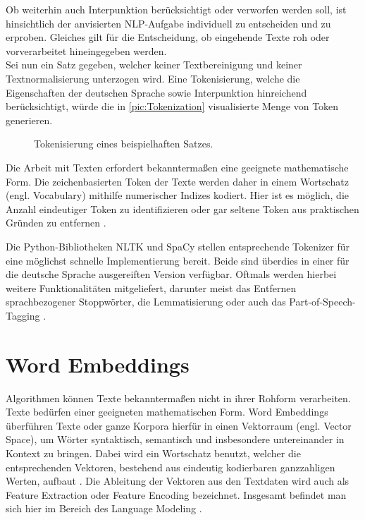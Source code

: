 \noindent
Ob weiterhin auch Interpunktion berücksichtigt oder verworfen werden soll, ist hinsichtlich der anvisierten \ac{NLP}-Aufgabe individuell zu entscheiden und zu erproben. Gleiches gilt für die Entscheidung, ob eingehende Texte roh oder vorverarbeitet hineingegeben werden.\\

\noindent
Sei nun ein Satz gegeben, welcher keiner Textbereinigung und keiner Textnormalisierung unterzogen wird. Eine Tokenisierung, welche die Eigenschaften der deutschen Sprache sowie Interpunktion hinreichend berücksichtigt, würde die in \autoref{pic:Tokenization} visualisierte Menge von Token generieren.

\begin{figure}[h!]
  \centering
  \caption{Tokenisierung eines beispielhaften Satzes.}
  \label{pic:Tokenization}
\end{figure}

\noindent
Die Arbeit mit Texten erfordert bekanntermaßen eine geeignete mathematische Form. Die zeichenbasierten Token der Texte werden daher in einem Wortschatz (engl. Vocabulary) mithilfe numerischer Indizes kodiert. Hier ist es möglich, die Anzahl eindeutiger Token zu identifizieren oder gar seltene Token aus praktischen Gründen zu entfernen \cite[S.~311-312]{ZHA20}.
\newpage

\noindent
Die Python-Bibliotheken \ac{NLTK} und SpaCy stellen entsprechende Tokenizer für eine möglichst schnelle Implementierung bereit. Beide sind überdies in einer für die deutsche Sprache ausgereiften Version verfügbar. Oftmals werden hierbei weitere Funktionalitäten mitgeliefert, darunter meist das Entfernen sprachbezogener Stoppwörter, die Lemmatisierung oder auch das Part-of-Speech-Tagging \cite[S.~111]{BIR09}.


\section{Word Embeddings}
\noindent
Algorithmen können Texte bekanntermaßen nicht in ihrer Rohform verarbeiten. Texte bedürfen einer geeigneten mathematischen Form. Word Embeddings überführen Texte oder ganze Korpora hierfür in einen Vektorraum (engl. Vector Space), um Wörter syntaktisch, semantisch und insbesondere untereinander in Kontext zu bringen. Dabei wird ein Wortschatz benutzt, welcher die entsprechenden Vektoren, bestehend aus eindeutig kodierbaren ganzzahligen Werten, aufbaut \cite{KAR18}. Die Ableitung der Vektoren aus den Textdaten wird auch als Feature Extraction oder Feature Encoding bezeichnet. Insgesamt befindet man sich hier im Bereich des Language Modeling \cite{BRO19}.\\


